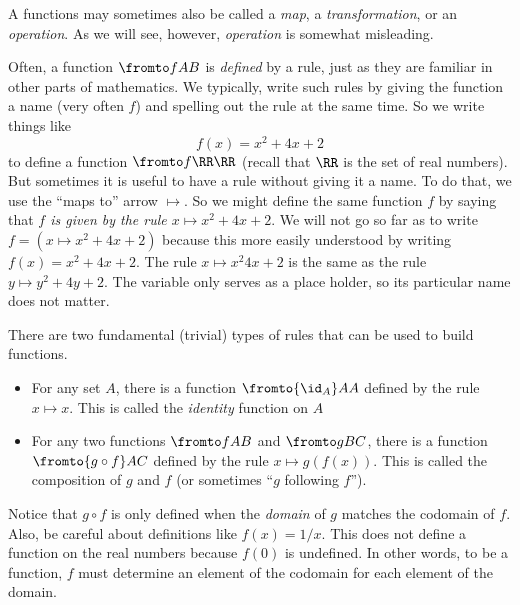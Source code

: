 A functions may sometimes also be called a \emph{map}, a \emph{transformation}, or an \emph{operation}. 
As we will see, however, \emph{operation} is somewhat misleading. 

Often, a function $\fromto fAB$ is \emph{defined} by a rule, just as they are familiar in other parts of mathematics. 
We typically, write such rules by giving the function a name (very often $f$) and spelling out the rule at the same time.
So we write things like
\[f(x)=x^2 + 4x + 2\]
to define a function $\fromto f\RR\RR$ (recall that $\RR$ is the set of real numbers).
But sometimes it is useful to have a rule without giving it a name.
To do that, we use the ``maps to'' arrow $\mapsto$.
So we might define the same function $f$ by saying that \emph{$f$ is given by the rule $x\mapsto x^2 + 4x + 2$}. 
We will not go so far as to write $f = (x\mapsto x^2+4x+2)$ because this more easily understood by writing $f(x)=x^2+4x+2$.
The rule $x\mapsto x^2  4x + 2$ is the same as the rule $y\mapsto y^2 + 4y + 2$. 
The variable only serves as a place holder, so its particular name does not matter.

There are two fundamental (trivial) types of rules that can be used to build functions.

\begin{axiom}
	\begin{itemize}
		\item For any set $A$, there is a function $\fromto {\id_A}AA$ defined by the rule $x\mapsto x$.
		This is called the \emph{identity} function on $A$
		\item For any two functions $\fromto fAB$ and $\fromto gBC$, there is a function $\fromto {g\circ f}AC$ defined by the rule $x\mapsto g(f(x))$.
		This is called the composition of $g$ and $f$ (or sometimes ``$g$ following $f$'').
	\end{itemize}
\end{axiom}


Notice that $g\circ f$ is only defined when the \emph{domain} of $g$ matches the codomain of $f$.
Also, be careful about definitions like $f(x)=1/x$.
This does not define a function on the real numbers because $f(0)$ is undefined.
In other words, to be a function, $f$ must determine an element of the codomain for each element of the domain.

